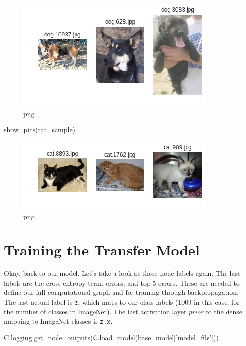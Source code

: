 \documentclass[]{book}
\newenvironment{Shaded}{\begin{snugshade}}{\end{snugshade}}
\newcommand{\StringTok}[1]{\textcolor[rgb]{0.31,0.60,0.02}{#1}}
\newcommand{\NormalTok}[1]{#1}
\theoremstyle{definition}
\theoremstyle{definition}
\theoremstyle{definition}
\theoremstyle{remark}
\begin{document}
\begin{figure}
\centering
\includegraphics{CNTK-Transfer-Cats-Dogs_files/CNTK-Transfer-Cats-Dogs_37_0.png}
\caption{png}
\end{figure}

\begin{Shaded}
\begin{Highlighting}[]
\NormalTok{show_pics(cat_sample)}
\end{Highlighting}
\end{Shaded}

\begin{figure}
\centering
\includegraphics{CNTK-Transfer-Cats-Dogs_files/CNTK-Transfer-Cats-Dogs_38_0.png}
\caption{png}
\end{figure}

\section{Training the Transfer Model}\label{training-the-transfer-model}

Okay, back to our model. Let's take a look at those node labels again.
The last labels are the cross-entropy term, errors, and top-5 errors.
These are needed to define our full computational graph and for training
through backpropagation. The last actual label is \texttt{z}, which maps
to our class labels (1000 in this case, for the number of classes in
\href{http://www.image-net.org/}{ImageNet}). The last activation layer
\emph{prior} to the dense mapping to ImageNet classes is \texttt{z.x}.

\begin{Shaded}
\begin{Highlighting}[]
\NormalTok{C.logging.get_node_outputs(C.load_model(base_model[}\StringTok{'model_file'}\NormalTok{]))}
\end{Highlighting}
\end{Shaded}
\end{document}

